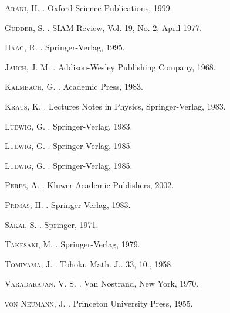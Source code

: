 \documentclass[11pt]{article}
\begin{document}
\newpage
{}
\begin{thebibliography}{999}
\begin{small}
\textsc{Araki, H.}
.
\newblock Oxford Science Publications, 1999.

\textsc{Gudder, S.}
.
\newblock SIAM Review, Vol. 19, No. 2, April 1977.

\textsc{Haag, R.}
.
\newblock Springer-Verlag, 1995.


\textsc{Jauch, J. M.}
.
\newblock Addison-Wesley Publishing Company, 1968.

\textsc{Kalmbach, G.}
.
\newblock Academic Press, 1983.

\textsc{Kraus, K.}
.
\newblock Lectures Notes in Physics, Springer-Verlag, 1983.

\textsc{Ludwig, G.}
.
\newblock Springer-Verlag, 1983.

\textsc{Ludwig, G.}
.
\newblock Springer-Verlag, 1985.

\textsc{Ludwig, G.}
.
\newblock Springer-Verlag, 1985.

\textsc{Peres, A.}
.
\newblock Kluwer Academic Publishers, 2002.

\textsc{Primas, H.}
.
\newblock Springer-Verlag, 1983.

\textsc{Sakai, S.}
.
\newblock Springer, 1971.

\textsc{Takesaki, M.}
.
\newblock Springer-Verlag, 1979.

\textsc{Tomiyama, J.}
.
\newblock Tohoku Math. J.. 33, 10., 1958.

\textsc{Varadarajan, V. S.}
.
\newblock Van Nostrand, New York, 1970.

\textsc{von Neumann, J.}
.
\newblock Princeton University Press, 1955.
\end{small}
\end{thebibliography}
\end{document}
